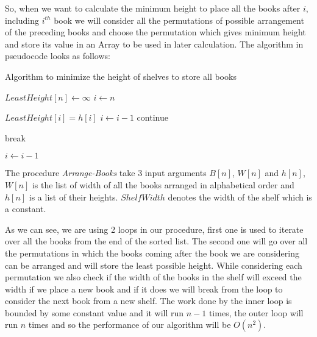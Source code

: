 \documentclass[8pt]{article}
\begin{document}
So, when we want to calculate the minimum height to place all the books after $i$, including $i^{th}$ book we will consider all the permutations of possible arrangement of the preceding books and choose the permutation which gives minimum height and store its value in an Array to be used in later calculation. The algorithm in pseudocode looks as follows:
\begin{algorithm}
\caption{Algorithm to minimize the height of shelves to store all books}\label{euclid}
\begin{algorithmic}[1]

\State $LeastHeight[n] \leftarrow \infty$
\State $i \leftarrow n$

        \State $LeastHeight[i] = h[i]$ 
        \State $i \leftarrow i - 1$
        \State continue
    \EndIf


            \State break
        \EndIf
        \EndIf
    \EndWhile

    \State $i \leftarrow i - 1$

\EndWhile

\State {}

\EndProcedure
\end{algorithmic}
\end{algorithm}

The procedure \textit{Arrange-Books} take 3 input arguments $B[n]$, $W[n]$ and $h[n]$, $W[n]$ is the list of width of all the books arranged in alphabetical order and $h[n]$ is a list of their heights. $ShelfWidth$ denotes the width of the shelf which is a constant.

As we can see,  we are using 2 loops in our procedure, first one is used to iterate over all the books from the end of the sorted list. The second one will go over all the permutations in which the books coming after the book we are considering can be arranged and will store the least possible height. While considering each permutation we also check if the width of the books in the shelf will exceed the width if we place a new book and if it does we will break from the loop to consider the next book from a new shelf. The work done by the inner loop is bounded by some constant value and it will run $n - 1$ times, the outer loop will run $n$ times and so the performance of our algorithm will be $O(n^2).$
\end{document}
